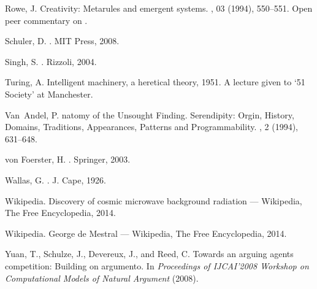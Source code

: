 \begin{thebibliography}{10}
{\sc Rowe, J.}
\newblock Creativity: {M}etarules and emergent systems.
, 03 (1994), 550--551.
\newblock Open peer commentary on \cite{boden}.

{\sc Schuler, D.}
.
\newblock MIT Press, 2008.

{\sc Singh, S.}
.
\newblock Rizzoli, 2004.

{\sc Turing, A.}
\newblock Intelligent machinery, a heretical theory, 1951.
\newblock A lecture given to {`}51 Society{'} at Manchester.

{\sc Van~Andel, P.}
natomy of the {U}nsought {F}inding. {S}erendipity: {O}rgin,
  {H}istory, {D}omains, {T}raditions, {A}ppearances, {P}atterns and
  {P}rogrammability.
, 2 (1994),
  631--648.

{\sc von Foerster, H.}
.
\newblock Springer, 2003.

{\sc Wallas, G.}
.
\newblock J. Cape, 1926.

{\sc Wikipedia}.
\newblock Discovery of cosmic microwave background radiation --- {W}ikipedia{,}
  {T}he {F}ree {E}ncyclopedia, 2014.

{\sc Wikipedia}.
\newblock George de {M}estral --- {W}ikipedia{,} {T}he {F}ree {E}ncyclopedia,
  2014.

{\sc Yuan, T., Schulze, J., Devereux, J., and Reed, C.}
\newblock Towards an arguing agents competition: Building on argumento.
\newblock In {\em Proceedings of IJCAI'2008 Workshop on Computational Models of
  Natural Argument\/} (2008).

\end{thebibliography}
